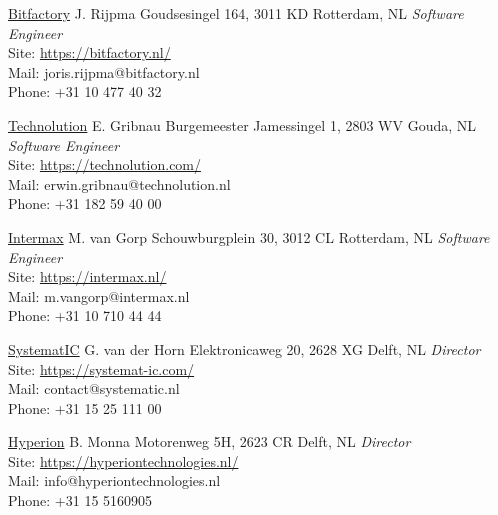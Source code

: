 \documentclass[]{cv-timvisee}
\begin{document}
\begin{entrylist}

\entry
{\href{https://bitfactory.nl}{Bitfactory}}
{J. Rijpma}
{Goudsesingel 164, 3011 KD Rotterdam, NL}
{\emph{Software Engineer} \\
Site: \href{https://bitfactory.nl}{https://bitfactory.nl/} \\
Mail: joris.rijpma@bitfactory.nl \\
Phone: +31 10 477 40 32}

\entry
{\href{https://technolution.com}{Technolution}}
{E. Gribnau}
{Burgemeester Jamessingel 1, 2803 WV Gouda, NL}
{\emph{Software Engineer} \\
Site: \href{https://technolution.com}{https://technolution.com/} \\
Mail: erwin.gribnau@technolution.nl \\
Phone: +31 182 59 40 00}

\entry
{\href{https://intermax.nl}{Intermax}}
{M. van Gorp}
{Schouwburgplein 30, 3012 CL Rotterdam, NL}
{\emph{Software Engineer} \\
Site: \href{https://intermax.nl}{https://intermax.nl/} \\
Mail: m.vangorp@intermax.nl \\
Phone: +31 10 710 44 44}

\entry
{\href{https://systemat-ic.com}{SystematIC}}
{G. van der Horn}
{Elektronicaweg 20, 2628 XG Delft, NL}
{\emph{Director} \\
Site: \href{https://systemat-ic.com/}{https://systemat-ic.com/} \\
Mail: contact@systematic.nl \\
Phone: +31 15 25 111 00}

\entry
{\href{https://hyperiontechnologies.nl/}{Hyperion}}
{B. Monna}
{Motorenweg 5H, 2623 CR Delft, NL}
{\emph{Director} \\
Site: \href{https://hyperiontechnologies.nl/}{https://hyperiontechnologies.nl/} \\
Mail: info@hyperiontechnologies.nl \\
Phone: +31 15 5160905}

\end{entrylist}
\end{document}
